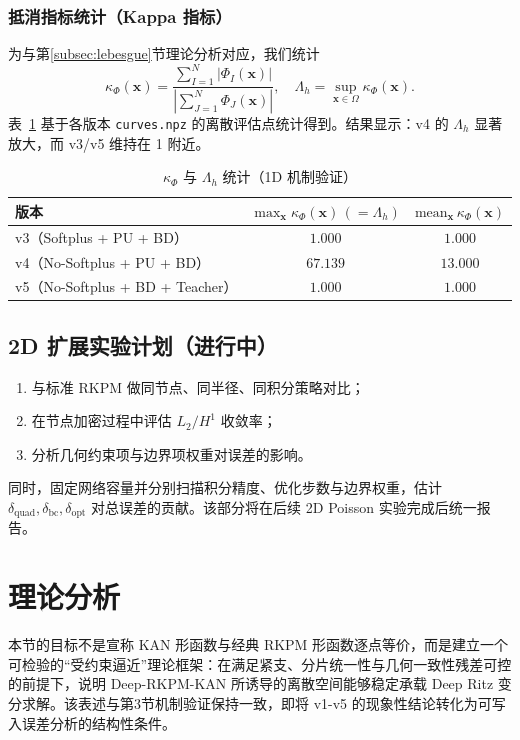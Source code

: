 ﻿\documentclass[lang=cn,a4paper]{elegantpaper}
\begin{document}
\subsubsection{抵消指标统计（Kappa 指标）}
为与第\ref{subsec:lebesgue}节理论分析对应，我们统计
\begin{equation}
  \kappa_\Phi(\bm{x})=\frac{\sum_{I=1}^{N}|\Phi_I(\bm{x})|}{\left|\sum_{J=1}^{N}\Phi_J(\bm{x})\right|},
  \quad
  \Lambda_h=\sup_{\bm{x}\in\Omega}\kappa_\Phi(\bm{x}).
\end{equation}
表~\ref{tab:kappa-v3-v5} 基于各版本 \texttt{curves.npz} 的离散评估点统计得到。结果显示：v4 的 $\Lambda_h$ 显著放大，而 v3/v5 维持在 1 附近。
\begin{table}[htbp]
  \centering
  \small
  \caption{$\kappa_\Phi$ 与 $\Lambda_h$ 统计（1D 机制验证）}
  \label{tab:kappa-v3-v5}
  \begin{tabular}{lcc}
    \toprule
    版本 & $\max_{\bm{x}}\kappa_\Phi(\bm{x})\,(=\Lambda_h)$ & $\mathrm{mean}_{\bm{x}}\,\kappa_\Phi(\bm{x})$ \\
    \midrule
    v3（Softplus + PU + BD） & $1.000$ & $1.000$ \\
    v4（No-Softplus + PU + BD） & $67.139$ & $13.000$ \\
    v5（No-Softplus + BD + Teacher） & $1.000$ & $1.000$ \\
    \bottomrule
  \end{tabular}
\end{table}

\subsection{2D 扩展实验计划（进行中）}
\begin{enumerate}[label=\arabic*.]
  \item 与标准 RKPM 做同节点、同半径、同积分策略对比；
  \item 在节点加密过程中评估 $L_2/H^1$ 收敛率；
  \item 分析几何约束项与边界项权重对误差的影响。
\end{enumerate}

同时，固定网络容量并分别扫描积分精度、优化步数与边界权重，估计
$\delta_{\mathrm{quad}},\delta_{\mathrm{bc}},\delta_{\mathrm{opt}}$
对总误差的贡献。该部分将在后续 2D Poisson 实验完成后统一报告。
\section{理论分析}
本节的目标不是宣称 KAN 形函数与经典 RKPM 形函数逐点等价，而是建立一个可检验的“受约束逼近”理论框架：在满足紧支、分片统一性与几何一致性残差可控的前提下，说明 Deep-RKPM-KAN 所诱导的离散空间能够稳定承载 Deep Ritz 变分求解。该表述与第3节机制验证保持一致，即将 v1-v5 的现象性结论转化为可写入误差分析的结构性条件。
\end{document}
